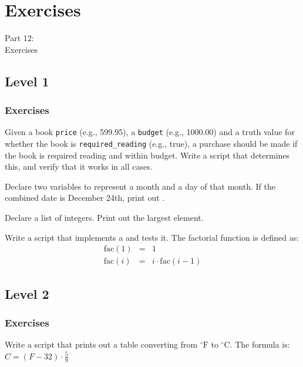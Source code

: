 
{
\renewcommand{\bgcolor}{exercises}

\section{Exercises}
\begin{frame}
    \vspace{25mm}
    \begin{center}
        \Huge{Part 12:\\Exercises}
    \end{center}
\end{frame}

\subsection{Level 1}
\begin{frame}[fragile]
    \frametitle{Exercises }
    \vspace{1mm}
    Given a book \texttt{price} (e.g., 599.95), a \texttt{budget} (e.g., 1000.00) and a truth value for whether the book is \texttt{required\_reading} (e.g., true), a purchase should be made if the book is required reading and within budget. Write a script that determines this, and verify that it works in all cases.
    
    \vspace{5mm}
    Declare two variables to represent a month and a day of that month. If the combined date is December 24th, print out .
    
    \vspace{5mm}
    Declare a list of integers. Print out the largest element.
    
    \vspace{5mm}
    Write a script that implements a  and tests it. The factorial function is defined as:
    \begin{eqnarray*}
      \mathrm{fac}(1) &=& 1 \\
      \mathrm{fac}(i) &=& i \cdot \mathrm{fac}(i-1)
    \end{eqnarray*}
\end{frame}

\subsection{Level 2}
\begin{frame}[fragile]
    \frametitle{Exercises }
    \vspace{1mm}
    Write a script that prints out a table converting from $^\circ\mathrm{F}$ to $^\circ\mathrm{C}$. The formula is: $C = (F-32) \cdot \frac{5}{9}$
    

\end{frame}}

